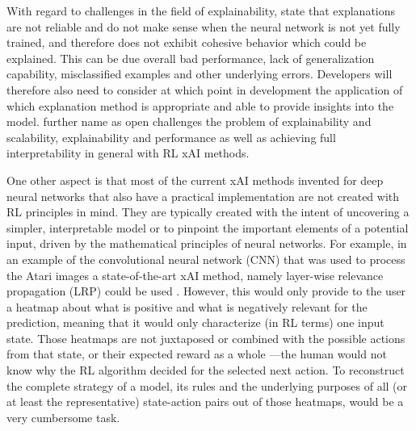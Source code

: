 \documentclass[twoside,11pt]{article}
\begin{document}
With regard to challenges in the field of explainability, \citet{GlanoisEtAl:2021:SurveyInterpretableRL} state that explanations are not reliable and do not make sense when the neural network is not yet fully trained, and therefore does not exhibit cohesive behavior which could be explained. This can be due overall bad performance, lack of generalization capability, misclassified examples and other underlying errors. Developers will therefore also need to consider at which point in development the application of which explanation method is appropriate and able to provide insights into the model. \citet{GlanoisEtAl:2021:SurveyInterpretableRL} further name as open challenges the problem of explainability and scalability, explainability and performance as well as achieving full interpretability in general with RL xAI methods.

One other aspect is that most of the current xAI methods invented for deep neural networks that also have a practical implementation are not created with RL principles in mind. They are typically created with the intent of uncovering a simpler, interpretable model or to pinpoint the important elements of a potential input, driven by the mathematical principles of neural networks. For example, in an example of the convolutional neural network (CNN) that was used to process the Atari images \citep{Mnih:2013:PlayingAtariDeepRL} a state-of-the-art xAI method, namely layer-wise relevance propagation (LRP) could be used \citep{Bach:2015:LayerWiseRelevancePropagation,Alber:2019:Innvestigate}. However, this would only provide to the user a heatmap about what is positive and what is negatively relevant for the prediction, meaning that it would only characterize (in RL terms) one input state. Those heatmaps are not juxtaposed or combined with the possible actions from that state, or their expected reward as a whole ---the human would not know why the RL algorithm decided for the selected next action. To reconstruct the complete strategy of a model, its rules and the underlying purposes of all (or at least the representative) state-action pairs out of those heatmaps, would be a very cumbersome task. 
\end{document}
